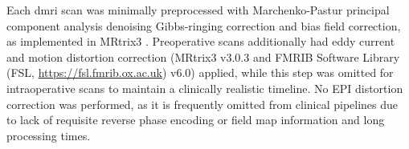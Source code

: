 Each \gls{dmri} scan was minimally preprocessed with Marchenko-Pastur principal component analysis denoising\autocite{Veraart2016, Cordero-Grande2019} Gibbs-ringing correction\autocite{Kellner2016} and bias field correction,\autocite{Zhang2001, Smith2004} as implemented in MRtrix3 \autocite{Tournier2019}.
Preoperative scans additionally had eddy current and motion distortion correction\autocite{Andersson2016a, Smith2004} (MRtrix3 v3.0.3 and FMRIB Software Library (FSL, \url{https://fsl.fmrib.ox.ac.uk}) v6.0) applied, while this step was omitted for intraoperative scans to maintain a clinically realistic timeline.
No EPI distortion correction was performed, as it is frequently omitted from clinical pipelines due to lack of requisite reverse phase encoding or field map information and long processing times.\autocite{Yang2022}

